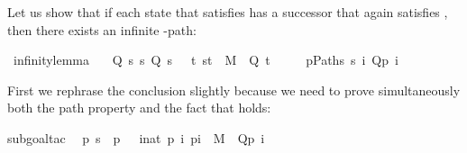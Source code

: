 \begin{isabellebody}
\begin{isamarkuptext}
Let us show that if each state  that satisfies 
has a successor that again satisfies , then there exists an infinite -path:%
\end{isamarkuptext}%
\isamarkuptrue%
\isamarkupfalse%
\ infinity{}lemma{}\isanewline
\ \ {}{}\ Q\ s{}\ {}s{}\ Q\ s\ {}\ {}{}\ t{}\ {}s{}t{}\ {}\ M\ {}\ Q\ t{}\ {}\ {}\isanewline
\ \ \ {}p{}Paths\ s{}\ {}i{}\ Q{}p\ i{}{}%
\isadelimproof
%
\endisadelimproof
%
\isatagproof
%
\begin{isamarkuptxt}%
\noindent
First we rephrase the conclusion slightly because we need to prove simultaneously
both the path property and the fact that  holds:%
\end{isamarkuptxt}%
\isamarkuptrue%
\isamarkupfalse%
{}subgoal{}tac\isanewline
\ \ {}{}p{}\ s\ {}\ p\ {}\ {}\ {}{}i{}{}nat{}\ {}p\ i{}\ p{}i{}{}{}{}\ {}\ M\ {}\ Q{}p\ i{}{}{}{}%

\end{isabellebody}
